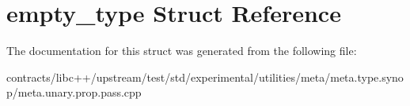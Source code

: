 \hypertarget{structempty__type}{}\section{empty\+\_\+type Struct Reference}
\label{structempty__type}


The documentation for this struct was generated from the following file\+:\begin{DoxyCompactItemize}
\item 
contracts/libc++/upstream/test/std/experimental/utilities/meta/meta.\+type.\+synop/meta.\+unary.\+prop.\+pass.\+cpp\end{DoxyCompactItemize}
